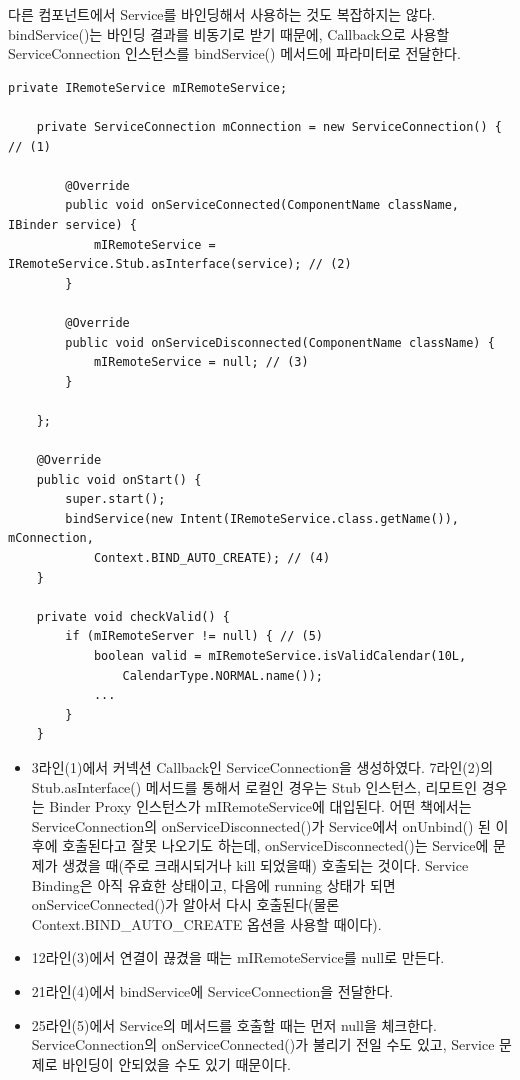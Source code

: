다른 컴포넌트에서 Service를 바인딩해서 사용하는 것도 복잡하지는 않다. 
bindService()는 바인딩 결과를 비동기로 받기 때문에, Callback으로 사용할 ServiceConnection 인스턴스를 bindService() 메서드에 파라미터로 전달한다.
\begin{lstlisting}[frame=single]
	private IRemoteService mIRemoteService;

	private ServiceConnection mConnection = new ServiceConnection() { // (1)

		@Override
    	public void onServiceConnected(ComponentName className, IBinder service) {
        	mIRemoteService = IRemoteService.Stub.asInterface(service); // (2)
    	}

    	@Override
    	public void onServiceDisconnected(ComponentName className) {
        	mIRemoteService = null; // (3)
    	}
    	
	};

	@Override
	public void onStart() {
		super.start();
		bindService(new Intent(IRemoteService.class.getName()), mConnection,
			Context.BIND_AUTO_CREATE); // (4)
	}
	
	private void checkValid() {
		if (mIRemoteServer != null) { // (5)
			boolean valid = mIRemoteService.isValidCalendar(10L,
				CalendarType.NORMAL.name());
			...
		}	
	}
\end{lstlisting}
\begin{itemize}
\item 3라인(1)에서 커넥션 Callback인 ServiceConnection을 생성하였다. 7라인(2)의 Stub.asInterface() 메서드를 통해서 로컬인 경우는 Stub 인스턴스, 리모트인 경우는 Binder Proxy 인스턴스가 mIRemoteService에 대입된다.
어떤 책에서는 ServiceConnection의 onServiceDisconnected()가 Service에서 onUnbind() 된 이후에 호출된다고 잘못 나오기도 하는데, onServiceDisconnected()는 Service에 문제가 생겼을 때(주로 크래시되거나 kill 되었을때) 호출되는 것이다.
Service Binding은 아직 유효한 상태이고, 다음에 running 상태가 되면 onServiceConnected()가 알아서 다시 호출된다(물론 Context.BIND\_AUTO\_CREATE 옵션을 사용할 때이다).
\item 12라인(3)에서 연결이 끊겼을 때는 mIRemoteService를 null로 만든다.
\item 21라인(4)에서 bindService에 ServiceConnection을 전달한다.
\item 25라인(5)에서 Service의 메서드를 호출할 때는 먼저 null을 체크한다. ServiceConnection의 onServiceConnected()가 불리기 전일 수도 있고, Service 문제로 바인딩이 안되었을 수도 있기 때문이다.
\end{itemize}

